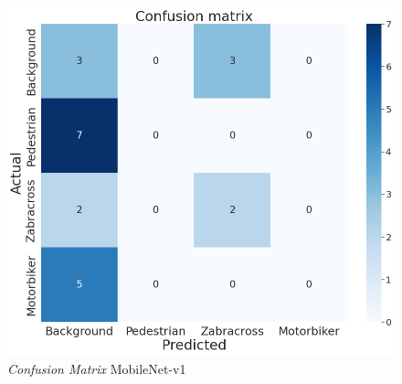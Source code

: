 \begin{figure}[H]
	\centering
	\includegraphics[scale=0.3]{gambar/confmatrix/all-mobilenetv1-blue.png}
	\caption{\textit{Confusion Matrix} MobileNet-v1}
	\label{fig:confmatrix-mobilenetv1}
\end{figure}